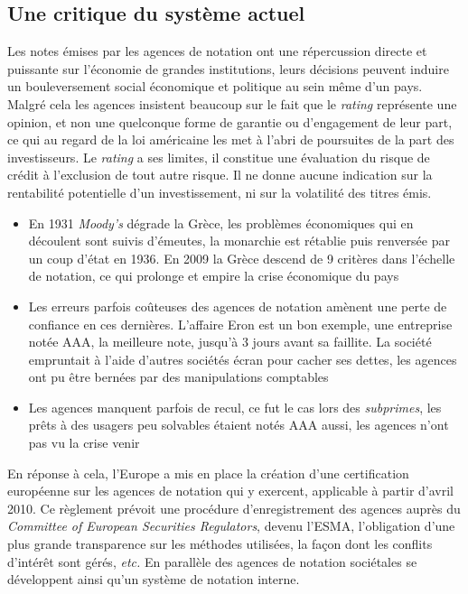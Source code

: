 \documentclass[main.tex]{subfiles}
\begin{document}
\subsection{Une critique du système actuel}

Les notes émises par les agences de notation ont une répercussion directe et puissante sur l'économie de grandes institutions, leurs décisions peuvent induire un bouleversement social économique et politique au sein même d'un pays. \\
Malgré cela les agences insistent beaucoup sur le fait que le \emph{rating} représente une opinion, et non une quelconque forme de garantie ou d'engagement de leur part, ce qui au regard de la loi américaine les met à l'abri de poursuites de la part des investisseurs. Le \emph{rating} a ses limites, il constitue une évaluation du risque de crédit à l'exclusion de tout autre risque. Il ne donne aucune indication sur la rentabilité potentielle d'un investissement, ni sur la volatilité des titres émis.

\begin{itemize}
        \item En 1931 \emph{Moody's} dégrade la Grèce, les problèmes économiques qui en découlent sont suivis d'émeutes, la monarchie est rétablie puis renversée par un coup d'état en 1936. En 2009 la Grèce descend de 9 critères dans l'échelle de notation, ce qui prolonge et empire la crise économique du pays
        \item Les erreurs parfois coûteuses des agences de notation amènent une perte de confiance en ces dernières. L'affaire Eron est un bon exemple, une entreprise notée AAA, la meilleure note, jusqu'à 3 jours avant sa faillite. La société empruntait à l'aide d'autres sociétés écran pour cacher ses dettes, les agences ont pu être bernées par des manipulations comptables
        \item Les agences manquent parfois de recul, ce fut le cas lors des \emph{subprimes}, les prêts à des usagers peu solvables étaient notés AAA aussi, les agences n'ont pas vu la crise venir
\end{itemize}

En réponse à cela, l'Europe a mis en place la création d'une certification européenne sur les agences de notation qui y exercent, applicable à partir d'avril 2010. Ce règlement prévoit une procédure d'enregistrement des agences auprès du \emph{Committee of European Securities Regulators}, devenu l'ESMA, l'obligation d'une plus grande transparence sur les méthodes utilisées, la façon dont les conflits d'intérêt sont gérés, \textit{etc.} En parallèle des agences de notation sociétales se développent ainsi qu'un système de notation interne.
\end{document}
